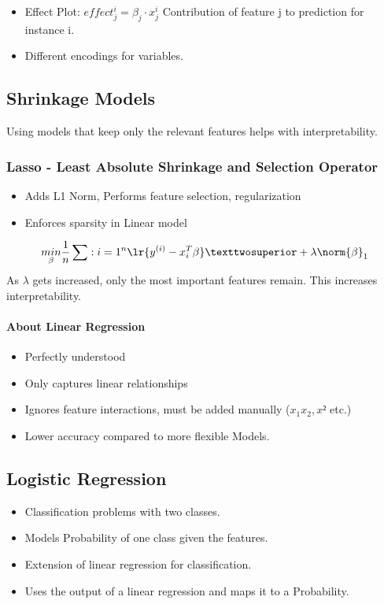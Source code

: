 \begin{itemize}
	\item Effect Plot: $effect_j^i = \beta_j \cdot x_j^i$ Contribution of feature j to prediction for instance i.
	\item Different encodings for variables.
\end{itemize}

\subsection{Shrinkage Models}
Using models that keep only the relevant features helps with interpretability.

\subsubsection{Lasso - Least Absolute Shrinkage and Selection Operator}
\begin{itemize}
	\item Adds L1 Norm, Performs feature selection, regularization
	\item Enforces sparsity in Linear model
\end{itemize}
\begin{equation}
	\underset{\beta}{min} \frac{1}{n}\sum:{i=1}^n\lr{y^{(i)}-x_i^T \beta }² + \lambda \norm{\beta}_1
	\label{eq:LASSO-L1}
\end{equation}
As $\lambda$ gets increased, only the most important features remain. This increases interpretability.

\paragraph{About Linear Regression}
\begin{itemize}
	\item Perfectly understood
	\item Only captures linear relationships
	\item Ignores feature interactions, must be added manually ($x_1x_2, x²$ etc.)
	\item Lower accuracy compared to more flexible Models.
\end{itemize}


\subsection{Logistic Regression}
\begin{itemize}
	\item Classification problems with two classes.
	\item Models Probability of one class given the features.
	\item Extension of linear regression for classification.
	\item Uses the output of a linear regression and maps it to a Probability.
\end{itemize}

